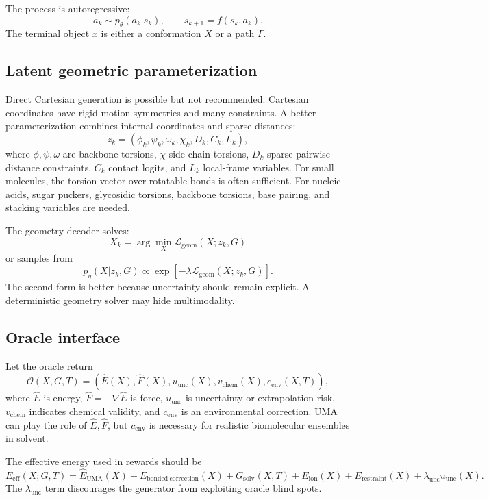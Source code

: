 \documentclass[11pt]{article}
\newcommand{\oracle}{\mathcal{O}}
\begin{document}
The process is autoregressive:
\[
a_k\sim p_\theta(a_k|s_k),\qquad s_{k+1}=f(s_k,a_k).
\]
The terminal object $x$ is either a conformation $X$ or a path $\Gamma$.

\subsection{Latent geometric parameterization}

Direct Cartesian generation is possible but not recommended. Cartesian coordinates have rigid-motion symmetries and many constraints. A better parameterization combines internal coordinates and sparse distances:
\[
z_k =
\left(
\phi_k,\psi_k,\omega_k,\chi_k,D_k,C_k,L_k
\right),
\]
where $\phi,\psi,\omega$ are backbone torsions, $\chi$ side-chain torsions, $D_k$ sparse pairwise distance constraints, $C_k$ contact logits, and $L_k$ local-frame variables. For small molecules, the torsion vector over rotatable bonds is often sufficient. For nucleic acids, sugar puckers, glycosidic torsions, backbone torsions, base pairing, and stacking variables are needed.

The geometry decoder solves:
\[
X_k = \arg\min_X
\mathcal{L}_{\mathrm{geom}}(X;z_k,G)
\]
or samples from
\[
p_\eta(X|z_k,G)\propto
\exp[-\lambda \mathcal{L}_{\mathrm{geom}}(X;z_k,G)].
\]
The second form is better because uncertainty should remain explicit. A deterministic geometry solver may hide multimodality.

\subsection{Oracle interface}

Let the oracle return
\[
\oracle(X,G,T)=
\left(
\hat{E}(X), \hat{F}(X), u_{\mathrm{unc}}(X),
v_{\mathrm{chem}}(X), c_{\mathrm{env}}(X,T)
\right),
\]
where $\hat{E}$ is energy, $\hat{F}=-\nabla \hat{E}$ is force, $u_{\mathrm{unc}}$ is uncertainty or extrapolation risk, $v_{\mathrm{chem}}$ indicates chemical validity, and $c_{\mathrm{env}}$ is an environmental correction. UMA can play the role of $\hat{E},\hat{F}$, but $c_{\mathrm{env}}$ is necessary for realistic biomolecular ensembles in solvent.

The effective energy used in rewards should be
\[
E_{\mathrm{eff}}(X;G,T)=
\hat{E}_{\mathrm{UMA}}(X)
+E_{\mathrm{bonded\ correction}}(X)
+G_{\mathrm{solv}}(X,T)
+E_{\mathrm{ion}}(X)
+E_{\mathrm{restraint}}(X)
+\lambda_{\mathrm{unc}}u_{\mathrm{unc}}(X).
\]
The $\lambda_{\mathrm{unc}}$ term discourages the generator from exploiting oracle blind spots.
\end{document}
